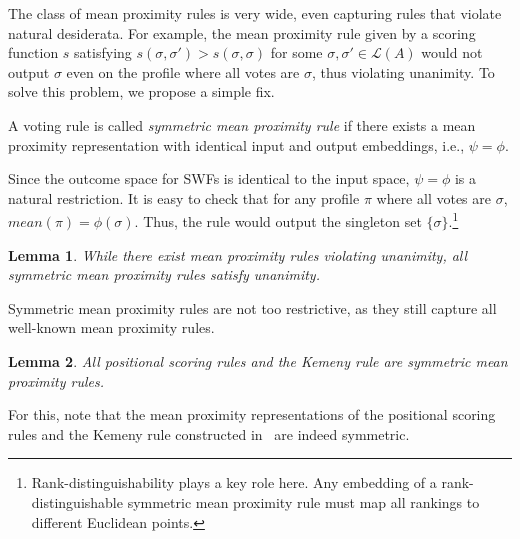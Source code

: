 \documentclass[10pt,letterpaper]{article}
\newcommand{\calL}{{\mathcal{L}}}
\newcommand{\rank}{{\calL(A)}}
\newtheorem{lemma}{Lemma}
\newenvironment{definition}[1][Definition]{\begin{trivlist}
\item[\hskip \labelsep {\bfseries #1}]}{\end{trivlist}}
\begin{document}


The class of mean proximity rules is very wide, even capturing rules that violate natural desiderata. For example, the mean proximity rule given by a scoring function $s$ satisfying $s(\sigma,\sigma') > s(\sigma,\sigma)$ for some $\sigma,\sigma' \in \rank$ would not output $\sigma$ even on the profile where all votes are $\sigma$, thus violating unanimity. To solve this problem, we propose a simple fix. 

\begin{definition}[Symmetric Mean Proximity Rules]
A voting rule is called \emph{symmetric mean proximity rule} if there exists a mean proximity representation with identical input and output embeddings, i.e., $\psi = \phi$. 
\end{definition} 

Since the outcome space for SWFs is identical to the input space, $\psi = \phi$ is a natural restriction. It is easy to check that for any profile $\pi$ where all votes are $\sigma$, $mean(\pi) = \phi(\sigma)$. Thus, the rule would output the singleton set $\{\sigma\}$.\footnote{Rank-distinguishability plays a key role here. Any embedding of a rank-distinguishable symmetric mean proximity rule must map all rankings to different Euclidean points.} 


\begin{lemma}
While there exist mean proximity rules violating unanimity, all symmetric mean proximity rules satisfy unanimity.
\end{lemma}

Symmetric mean proximity rules are not too restrictive, as they still capture all well-known mean proximity rules. 
\begin{lemma}
All positional scoring rules and the Kemeny rule are symmetric mean proximity rules.
\label{lem:symmetric-captures}
\end{lemma}

For this, note that the mean proximity representations of the positional scoring rules and the Kemeny rule constructed in~\cite{Zwicker08a} are indeed symmetric. 
\end{document}
